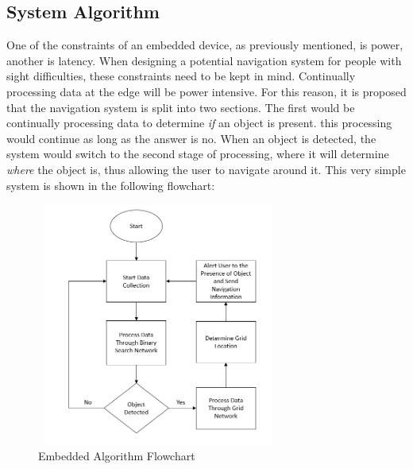 \documentclass[conference]{IEEEtran}
\begin{document}
\subsection{System Algorithm}
One of the constraints of an embedded device, as previously mentioned, is power, another is latency. When designing a potential navigation system for people with sight difficulties, these constraints need to be kept in mind. Continually processing data at the edge will be power intensive. For this reason, it is proposed that the navigation system is split into two sections. The first would be continually processing data to determine \textit{if} an object is present. this processing would continue as long as the answer is no. When an object is detected, the system would switch to the second stage of processing, where it will determine \textit{where} the object is, thus allowing the user to navigate around it. This very simple system is shown in the following flowchart:

\begin{figure}[ht]
\includegraphics[width=8cm, height=8cm]{images/embedded_algo_flowchart.png}
\centering
\caption{Embedded Algorithm Flowchart}
\label{fig:embedded_algo_flowchart}
\end{figure}






\printbibliography
\vspace{12pt}
\end{document}
